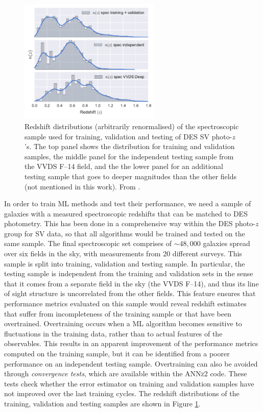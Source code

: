 \begin{figure}\centering \includegraphics[width=0.6\textwidth]{./chapters/chapter2/figs/spec_distrubution_of_machted_cat.pdf}\caption{Redshift distributions (arbitrarily renormalised) of the spectroscopic sample used for training, validation and testing of DES SV photo-$z$'s. The top panel shows the distribution for training and validation samples, the middle panel for the independent testing sample from the VVDS F--14 field, and the the lower panel for an additional testing sample that goes to deeper magnitudes than the other fields (not mentioned in this work). From \citet{bonnett}.}\label{fig:specz}\end{figure}

In order to train ML methods and test their performance, we need a sample of galaxies with a measured spectroscopic redshifts that can be matched to DES photometry. This has been done in a comprehensive way within the DES photo-$z$ group for SV data, so that all algorithms would be trained and tested on the same sample. The final spectroscopic set comprises of $\sim 48,000$ galaxies spread over six fields in the sky, with measurements from 20 different surveys. This sample is split into training, validation and testing sample. In particular, the testing sample is independent from the training and validation sets in the sense that it comes from a separate field in the sky (the VVDS F--14), and thus its line of sight structure is uncorrelated from the other fields. This feature ensures that performance metrics evaluated on this sample would reveal redshift estimates that suffer from incompleteness of the training sample or that have been overtrained. Overtraining occurs when a ML algorithm becomes sensitive to fluctuations in the training data, rather than to actual features of the observables. This results in an apparent improvement of the performance metrics computed on the training sample, but it can be identified from a poorer performance on an independent testing sample. Overtraining can also be avoided through \emph{convergence tests}, which are available within the \textsc{ANNz2} code. These tests check whether the error estimator on training and validation samples have not improved over the last training cycles. The redshift distributions of the training, validation and testing samples are shown in Figure \ref{fig:specz}.

